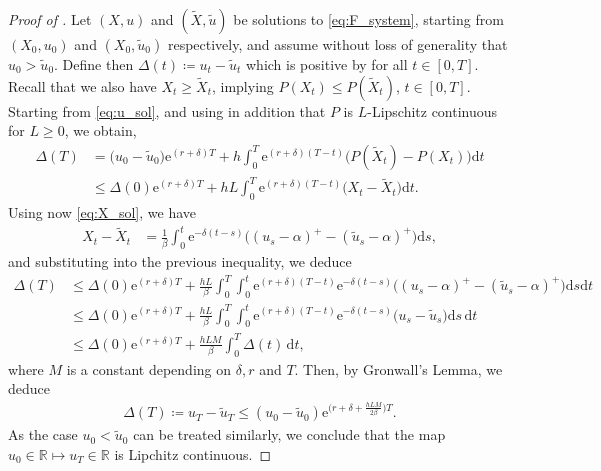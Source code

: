 \documentclass[12pt]{article}
\def \R{\mathbb{R}}
\def\erm{\mathrm{e}}
\def\drm{\mathrm{d}}
\begin{document}
\begin{proof}[Proof of ]
Let $(X,u)$ and $(\tilde X, \tilde{u})$ be solutions to \eqref{eq:F_system}, starting from $(X_0,u_0)$ and $(X_0, \tilde{u}_0)$ respectively, and assume without loss of generality that $u_0>\tilde{u}_0$. Define then $\Delta(t) \coloneq u_t - \tilde{u}_t$ which is positive by  for all $t\in[0,T]$. Recall that we also have $X_t \geq \tilde X_t$, implying $P(X_t) \leq  P( \tilde X_t)$, $t\in[0,T]$. Starting from \eqref{eq:u_sol}, and using in addition that $P$ is $L$-Lipschitz continuous for $L \geq 0$, we obtain,
\begin{align*}
\Delta(T)&= \big( u_0 - \tilde u_0 \big) \erm^{(r+\delta)T} 
+ h\int_{0}^{T} \erm^{(r+\delta)(T-t)} \big(P( \tilde X_t) - P(X_t) \big)  \drm t \\
&\leq \Delta(0) \erm^{(r+\delta)T} 
+ h L \int_{0}^{T} \erm^{(r+\delta)(T-t)} \big(X_t - \tilde X_t \big)  \drm t.
\end{align*} 
Using now \eqref{eq:X_sol}, we have
\begin{align*}
    X_t - \tilde X_t &= \frac{1}{\beta}\int_{0}^{t} \erm^{-\delta(t-s)} \big( (u_s-\alpha)^+ - (\tilde u_s-\alpha)^+ \big) \drm s,
\end{align*}
and substituting into the previous inequality, we deduce
\begin{align*}
\Delta(T)
&\leq \Delta(0) \erm^{(r+\delta)T} 
+ \frac{hL}{\beta} \int_{0}^{T} \int_{0}^{t} \erm^{(r+\delta)(T-t)} \erm^{-\delta(t-s)} \big( (u_s-\alpha)^+ - (\tilde u_s-\alpha)^+ \big) \drm s \drm t \\
&\leq \Delta(0) \erm^{(r+\delta)T}+\frac{hL}{\beta} \int_{0}^{T}\int_{0}^{t} \erm^{(r+\delta)(T-t)} \erm^{-\delta(t-s)} \big(u_s-\tilde{u}_s\big)  \drm s \, \drm t \\
&\leq \Delta(0) \erm^{(r+\delta)T}+\frac{hL M}{\beta} \int_{0}^{T} \Delta(t)\, \drm t,
\end{align*} 
where $M$ is a constant depending on $\delta, r$ and $T$.
Then, by Gronwall's Lemma, we deduce
\begin{align*}
    \Delta(T) \coloneq u_T-\tilde{u}_T \leq (u_0-\tilde{u}_{0}) \erm^{\big(r+\delta+\frac{h L M}{2\beta} \big)T}.
\end{align*}
As the case $u_0<\tilde{u}_0$ can be treated similarly, we conclude that the map $u_0 \in \R \longmapsto u_T \in \R$ is Lipchitz continuous. 


\end{proof}
\end{document}
